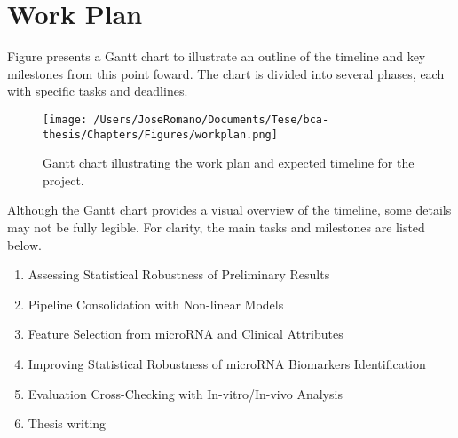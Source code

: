 
%

\chapter{Work Plan}
\label{cha:work_plan}

Figure presents a Gantt chart to illustrate an outline of the timeline and key
milestones from this point foward. The chart is divided into several phases,
each with specific tasks and deadlines.

\begin{figure}[htbp]
  \centering
  \texttt{[image: /Users/JoseRomano/Documents/Tese/bca-thesis/Chapters/Figures/workplan.png]}
  \caption{Gantt chart illustrating the work plan and expected timeline for the project.}
  \label{fig:gantt_chart}
\end{figure}

Although the Gantt chart provides a visual overview of the timeline, some
details may not be fully legible. For clarity, the main tasks and milestones
are listed below.

\begin{enumerate}
  \item Assessing Statistical Robustness of Preliminary Results
  \item Pipeline Consolidation with Non-linear Models
  \item Feature Selection from microRNA and Clinical Attributes
  \item Improving Statistical Robustness of microRNA Biomarkers Identification
  \item Evaluation Cross-Checking with In-vitro/In-vivo Analysis
  \item Thesis writing
\end{enumerate}